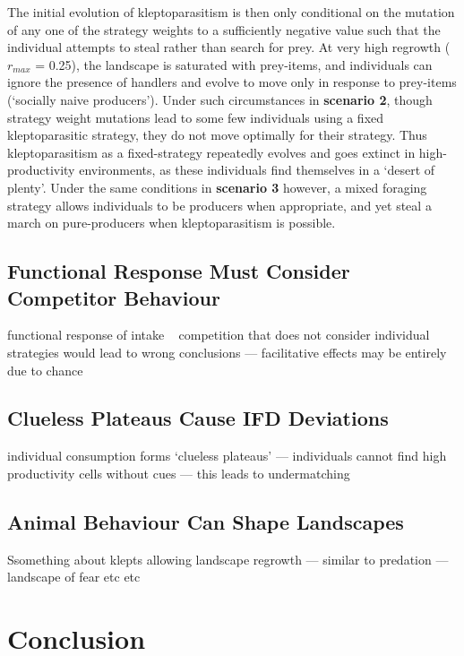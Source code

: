 \documentclass[11pt]{article}
\begin{document}
The initial evolution of kleptoparasitism is then only conditional on the mutation of any one of the strategy weights to a sufficiently negative value such that the individual attempts to steal rather than search for prey.
At very high regrowth ($r_{max}$ = 0.25), the landscape is saturated with prey-items, and individuals can ignore the presence of handlers and evolve to move only in response to prey-items (`socially naive producers').
Under such circumstances in \textbf{scenario 2}, though strategy weight mutations lead to some few individuals using a fixed kleptoparasitic strategy, they do not move optimally for their strategy.
Thus kleptoparasitism as a fixed-strategy repeatedly evolves and goes extinct in high-productivity environments, as these individuals find themselves in a `desert of plenty'.
Under the same conditions in \textbf{scenario 3} however, a mixed foraging strategy allows individuals to be producers when appropriate, and yet steal a march on pure-producers when kleptoparasitism is possible.

\subsection{Functional Response Must Consider Competitor Behaviour}

functional response of intake ~ competition that does not consider individual strategies would lead to wrong conclusions --- facilitative effects may be entirely due to chance

\subsection{Clueless Plateaus Cause IFD Deviations}

individual consumption forms `clueless plateaus' --- individuals cannot find high productivity cells without cues --- this leads to undermatching

\subsection{Animal Behaviour Can Shape Landscapes}

Ssomething about klepts allowing landscape regrowth --- similar to predation --- landscape of fear etc etc


\section{Conclusion}
\end{document}
